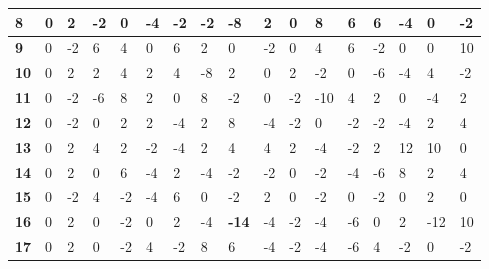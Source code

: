 \begin{longtable}[c]{|l|l|l|l|l|l|l|l|l|l|l|l|l|l|l|l|l|}
\textbf{8}  & 0          & 2          & -2         & 0          & -4         & -2         & -2         & -8         & 2          & 0          & 8           & 6           & 6           & -4          & 0           & -2          \\ \hline
\textbf{9}  & 0          & -2         & 6          & 4          & 0          & 6          & 2          & 0          & -2         & 0          & 4           & 6           & -2          & 0           & 0           & 10          \\ \hline
\textbf{10} & 0          & 2          & 2          & 4          & 2          & 4          & -8         & 2          & 0          & 2          & -2          & 0           & -6          & -4          & 4           & -2          \\ \hline
\textbf{11} & 0          & -2         & -6         & 8          & 2          & 0          & 8          & -2         & 0          & -2         & -10         & 4           & 2           & 0           & -4          & 2           \\ \hline
\textbf{12} & 0          & -2         & 0          & 2          & 2          & -4         & 2          & 8          & -4         & -2         & 0           & -2          & -2          & -4          & 2           & 4           \\ \hline
\textbf{13} & 0          & 2          & 4          & 2          & -2         & -4         & 2          & 4          & 4          & 2          & -4          & -2          & 2           & 12          & 10          & 0           \\ \hline
\textbf{14} & 0          & 2          & 0          & 6          & -4         & 2          & -4         & -2         & -2         & 0          & -2          & -4          & -6          & 8           & 2           & 4           \\ \hline
\textbf{15} & 0          & -2         & 4          & -2         & -4         & 6          & 0          & -2         & 2          & 0          & -2          & 0           & -2          & 0           & 2           & 0           \\ \hline
\textbf{16} & 0          & 2          & 0          & -2         & 0          & 2          & -4         & \textbf{-14}        & -4         & -2         & -4          & -6          & 0           & 2           & -12         & 10          \\ \hline
\textbf{17} & 0          & 2          & 0          & -2         & 4          & -2         & 8          & 6          & -4         & -2         & -4          & -6          & 4           & -2          & 0           & -2          \\ \hline

\end{longtable}
